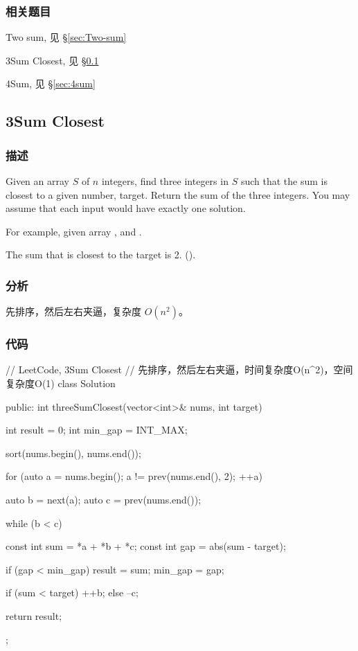 \subsubsection{相关题目}
\begindot
\item Two sum, 见 \S \ref{sec:Two-sum}
\item 3Sum Closest, 见 \S \ref{sec:3sum-closest}
\item 4Sum, 见 \S \ref{sec:4sum}
\myenddot

\subsection{3Sum Closest} %
\label{sec:3sum-closest}


\subsubsection{描述}
Given an array $S$ of $n$ integers, find three integers in $S$ such that the sum is closest to a given number, target. Return the sum of the three integers. You may assume that each input would have exactly one solution.

For example, given array , and .

The sum that is closest to the target is 2. ().


\subsubsection{分析}
先排序，然后左右夹逼，复杂度 $O(n^2)$。


\subsubsection{代码}
\begin{Code}
// LeetCode, 3Sum Closest
// 先排序，然后左右夹逼，时间复杂度O(n^2)，空间复杂度O(1)
class Solution {
public:
    int threeSumClosest(vector<int>& nums, int target) {
        int result = 0;
        int min_gap = INT_MAX;

        sort(nums.begin(), nums.end());

        for (auto a = nums.begin(); a != prev(nums.end(), 2); ++a) {
            auto b = next(a);
            auto c = prev(nums.end());

            while (b < c) {
                const int sum = *a + *b + *c;
                const int gap = abs(sum - target);

                if (gap < min_gap) {
                    result = sum;
                    min_gap = gap;
                }

                if (sum < target) ++b;
                else              --c;
            }
        }

        return result;
    }
};
\end{Code}


